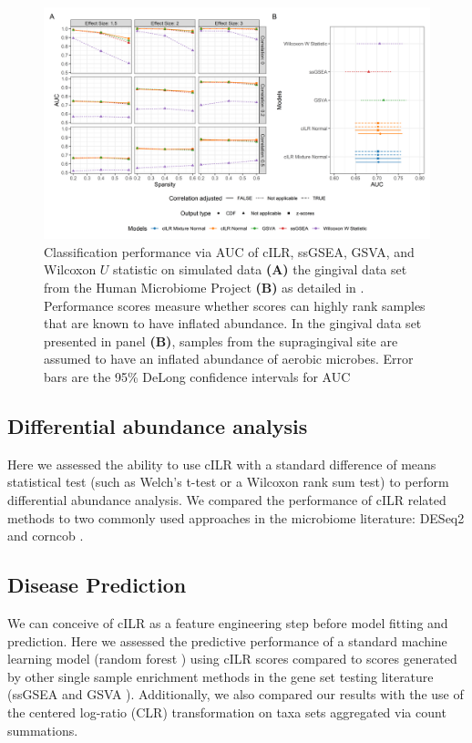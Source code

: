 \documentclass{article}
\begin{document}
\begin{figure}[H]
    \centering
    \includegraphics[width = \textwidth]{figures/sim_data_ss_auc.png}
    \caption{Classification performance via AUC of cILR, ssGSEA, GSVA, and Wilcoxon $U$ statistic on simulated data \textbf{(A)} the gingival data set from the Human Microbiome Project  \textbf{(B)} as detailed in . Performance scores measure whether scores can highly rank samples that are known to have inflated abundance. In the gingival data set presented in panel \textbf{(B)}, samples from the supragingival site are assumed to have an inflated abundance of aerobic microbes. Error bars are the 95\% DeLong confidence intervals for AUC \cite{delong1988}} 
    \label{fig:ss_auc}
\end{figure}

\subsection*{Differential abundance analysis}
Here we assessed the ability to use cILR with a standard difference of means statistical test (such as Welch's t-test or a Wilcoxon rank sum test) to perform differential abundance analysis. We compared the performance of cILR related methods to two commonly used approaches in the microbiome literature: DESeq2 \cite{love2014} and corncob \cite{martin2020}.   

\subsection*{Disease Prediction} 
We can conceive of cILR as a feature engineering step before model fitting and prediction. Here we assessed the predictive performance of a standard machine learning model (random forest \cite{breiman2001}) using cILR scores compared to scores generated by other single sample enrichment methods in the gene set testing literature (ssGSEA \cite{barbie2009} and GSVA \cite{hanzelmann2013}). Additionally, we also compared our results with the use of the centered log-ratio (CLR) transformation on taxa sets aggregated via count summations.    
\end{document}
